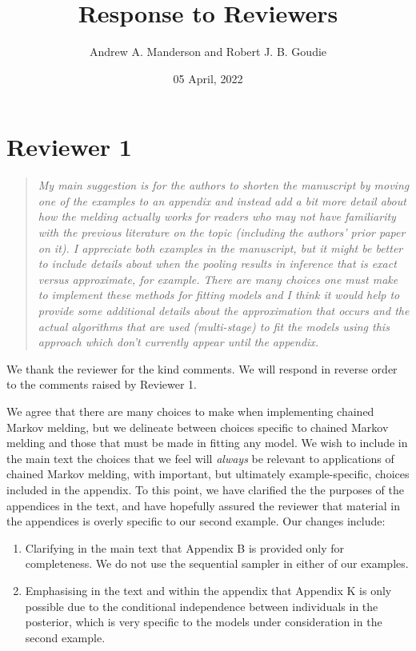 \documentclass[
  10pt,
  a4paper,
]{article}
\title{Response to Reviewers}
\author{Andrew A. Manderson and Robert J. B. Goudie}
\date{05 April, 2022}
\providecommand{\tightlist}{%
  \setlength{\itemsep}{0pt}\setlength{\parskip}{0pt}}
\begin{document}
\maketitle

\hypertarget{reviewer-1}{%
\section{Reviewer 1}\label{reviewer-1}}

\begin{quote}
\emph{My main suggestion is for the authors to shorten the manuscript by
moving one of the examples to an appendix and instead add a bit more
detail about how the melding actually works for readers who may not have
familiarity with the previous literature on the topic (including the
authors' prior paper on it). I appreciate both examples in the
manuscript, but it might be better to include details about when the
pooling results in inference that is exact versus approximate, for
example. There are many choices one must make to implement these methods
for fitting models and I think it would help to provide some additional
details about the approximation that occurs and the actual algorithms
that are used (multi-stage) to fit the models using this approach which
don't currently appear until the appendix.}
\end{quote}

We thank the reviewer for the kind comments. We will respond in reverse
order to the comments raised by Reviewer 1.

We agree that there are many choices to make when implementing chained
Markov melding, but we delineate between choices specific to chained
Markov melding and those that must be made in fitting any model. We wish
to include in the main text the choices that we feel will \emph{always}
be relevant to applications of chained Markov melding, with important,
but ultimately example-specific, choices included in the appendix. To
this point, we have clarified the the purposes of the appendices in the
text, and have hopefully assured the reviewer that material in the
appendices is overly specific to our second example. Our changes
include:

\begin{enumerate}
\def\labelenumi{\arabic{enumi}.}
\tightlist
\item
  Clarifying in the main text that Appendix B is provided only for
  completeness. We do not use the sequential sampler in either of our
  examples.
\item
  Emphasising in the text and within the appendix that Appendix K is
  only possible due to the conditional independence between individuals
  in the posterior, which is very specific to the models under
  consideration in the second example.
\end{enumerate}
\end{document}
